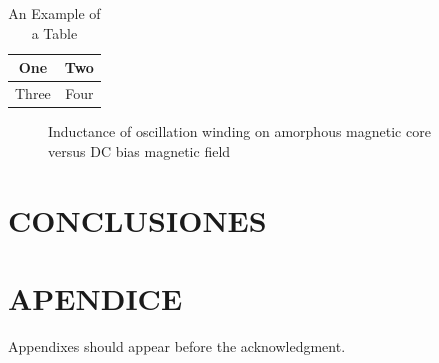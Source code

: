 \documentclass[a4paper, 10pt, journal]{ieeeconf}
\begin{document}
\begin{table}[h]
\caption{An Example of a Table}
\label{table_example}
\begin{center}
\begin{tabular}{|c||c|}
\hline
One & Two\\
\hline
Three & Four\\
\hline
\end{tabular}
\end{center}
\end{table}


   \begin{figure}[thpb]
      \centering
      \caption{Inductance of oscillation winding on amorphous
       magnetic core versus DC bias magnetic field}
      \label{figurelabel}
   \end{figure}

\section{CONCLUSIONES}


\addtolength{\textheight}{-12cm}   %







\section*{APENDICE}

Appendixes should appear before the acknowledgment.
\end{document}
